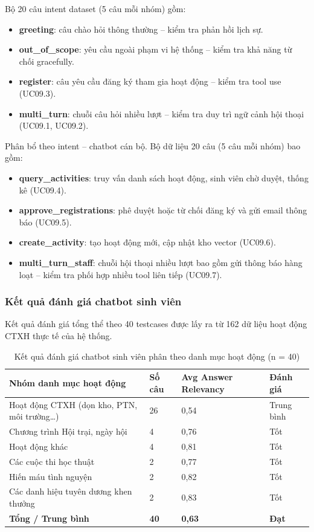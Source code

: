 Bộ 20 câu intent dataset (5 câu mỗi nhóm) gồm:
\begin{itemize}
    \item \textbf{greeting}: câu chào hỏi thông thường -- kiểm tra phản hồi lịch sự.
    \item \textbf{out\_of\_scope}: yêu cầu ngoài phạm vi hệ thống -- kiểm tra khả năng từ chối gracefully.
    \item \textbf{register}: câu yêu cầu đăng ký tham gia hoạt động -- kiểm tra tool use (UC09.3).
    \item \textbf{multi\_turn}: chuỗi câu hỏi nhiều lượt -- kiểm tra duy trì ngữ cảnh hội thoại (UC09.1, UC09.2).
\end{itemize}

Phân bổ theo intent -- chatbot cán bộ. Bộ dữ liệu 20 câu (5 câu mỗi nhóm) bao gồm:
\begin{itemize}
    \item \textbf{query\_activities}: truy vấn danh sách hoạt động, sinh viên chờ duyệt, thống kê (UC09.4).
    \item \textbf{approve\_registrations}: phê duyệt hoặc từ chối đăng ký và gửi email thông báo (UC09.5).
    \item \textbf{create\_activity}: tạo hoạt động mới, cập nhật kho vector (UC09.6).
    \item \textbf{multi\_turn\_staff}: chuỗi hội thoại nhiều lượt bao gồm gửi thông báo hàng loạt -- kiểm tra phối hợp nhiều tool liên tiếp (UC09.7).
\end{itemize}

\subsubsection{Kết quả đánh giá chatbot sinh viên}

Kết quả đánh giá tổng thể theo 40 testcases được lấy ra từ 162 dữ liệu hoạt động CTXH thực tế của hệ thống.
\begin{table}[H]
\centering
\renewcommand{\arraystretch}{1.3}
\small
\begin{tabular}{|p{7.5cm}|p{1.5cm}|p{2.8cm}|p{2.0cm}|}
\hline
\textbf{Nhóm danh mục hoạt động} & \textbf{Số câu} & \textbf{Avg Answer Relevancy} & \textbf{Đánh giá} \\
\hline
Hoạt động CTXH (dọn kho, PTN, môi trường\ldots) & 26 & 0{,}54 & Trung bình \\
\hline
Chương trình Hội trại, ngày hội & 4 & 0{,}76 & Tốt \\
\hline
Hoạt động khác & 4 & 0{,}81 & Tốt \\
\hline
Các cuộc thi học thuật & 2 & 0{,}77 & Tốt \\
\hline
Hiến máu tình nguyện & 2 & 0{,}82 & Tốt \\
\hline
Các danh hiệu tuyên dương khen thưởng & 2 & 0{,}83 & Tốt \\
\hline
\textbf{Tổng / Trung bình} & \textbf{40} & \textbf{0{,}63} & \textbf{Đạt} \\
\hline
\end{tabular}
\caption{Kết quả đánh giá chatbot sinh viên phân theo danh mục hoạt động (n = 40)}
\end{table}

